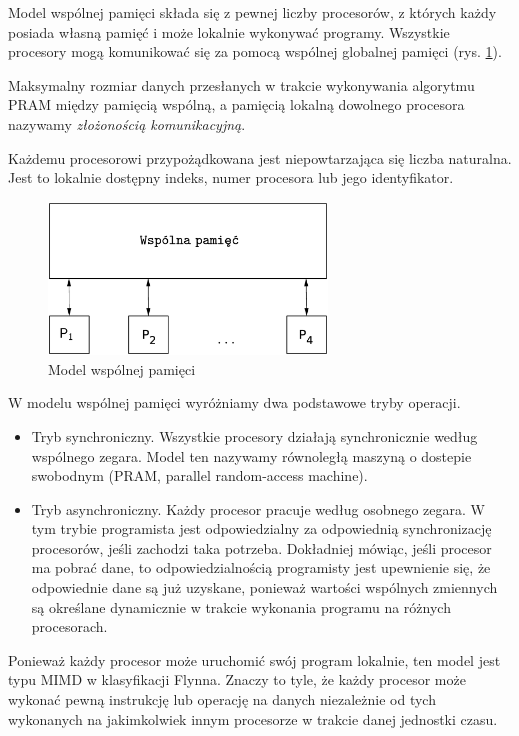 Model wspólnej pamięci składa się z pewnej liczby procesorów, z których każdy posiada własną pamięć i może lokalnie wykonywać programy. Wszystkie procesory mogą komunikować się za pomocą wspólnej globalnej pamięci (rys. \ref{fig:model_shared}).

\begin{definicja}\label{def:communication_complexity}
Maksymalny rozmiar danych przesłanych w trakcie wykonywania algorytmu PRAM między pamięcią wspólną, a pamięcią lokalną dowolnego procesora nazywamy \emph{złożonością komunikacyjną}.
\end{definicja}

Każdemu procesorowi przypożądkowana jest niepowtarzająca się liczba naturalna. Jest to lokalnie dostępny indeks, numer procesora lub jego identyfikator.

\begin{figure}[h]
\centering
\includegraphics[width=20em]{images/Rys4.eps}
\caption{Model wspólnej pamięci}
\label{fig:model_shared}
\end{figure}


W modelu wspólnej pamięci wyróżniamy dwa podstawowe tryby operacji.
\begin{itemize}
\item Tryb synchroniczny. Wszystkie procesory działają synchronicznie według wspólnego zegara. Model ten nazywamy równoległą maszyną o dostepie swobodnym (PRAM, parallel random-access machine).


\item Tryb asynchroniczny. Każdy procesor pracuje według osobnego zegara. W tym trybie programista jest odpowiedzialny za odpowiednią synchronizację procesorów, jeśli zachodzi taka potrzeba. Dokładniej mówiąc, jeśli procesor ma pobrać dane, to odpowiedzialnością programisty jest upewnienie się, że odpowiednie dane są już uzyskane, ponieważ wartości wspólnych zmiennych są określane dynamicznie w trakcie wykonania programu na różnych procesorach.
\end{itemize}

Ponieważ każdy procesor może uruchomić swój program lokalnie, ten model jest typu MIMD w klasyfikacji Flynna. Znaczy to tyle, że każdy procesor może wykonać pewną instrukcję lub operację na danych niezależnie od tych wykonanych na jakimkolwiek innym procesorze w trakcie danej jednostki czasu.


